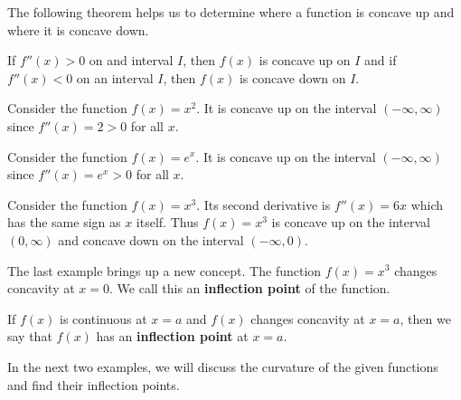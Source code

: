 \documentclass{ximera}
\begin{document}

The following theorem helps us to determine where a function is concave up and where it is concave down.\\

\begin{theorem}[Concavity]
If $f''(x) > 0$ on and interval $I$, then $f(x)$ is concave up on $I$ and
if $f''(x) < 0$ on an interval $I$, then $f(x)$ is concave down on $I$.
\end{theorem}



\begin{example} %
Consider the function $f(x) = x^2$.  It is concave up on the interval $(-\infty, \infty)$ since $f''(x) = 2 > 0$
for all $x$.
\end{example}

\begin{example} %
Consider the function $f(x) = e^x$.  It is concave up on the interval $(-\infty, \infty)$ since $f''(x) = e^x > 0$
for all $x$.
\end{example}


\begin{example} %
Consider the function $f(x) = x^3$.  Its second derivative is $f''(x) = 6x$ 
which has the same sign as $x$ itself. Thus $f(x) = x^3$ is concave up on the interval $(0, \infty)$
and concave down on the interval $(-\infty, 0)$.
\end{example}



The last example brings up a new concept.  The function $f(x) = x^3$ changes concavity at $x = 0$.  
We call this an {\bf inflection point} of the function.\\

\begin{definition}
If $f(x)$ is continuous at $x=a$ and $f(x)$ changes concavity at $x = a$, then
we say that $f(x)$ has an \textbf{inflection point} at $x = a$.
\end{definition} 

In the next two examples, we will discuss the curvature of the given functions and find their inflection points.


\begin{image}
\end{image}
\end{document}
